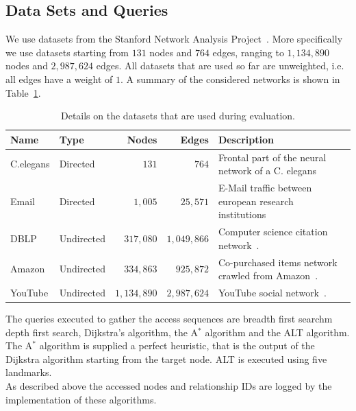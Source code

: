     \subsection*{Data Sets and Queries}
        We use datasets from the Stanford Network Analysis Project~\autocite{snap}.
        More specifically we use datasets starting from $131$ nodes and $764$ edges, ranging to $1,134,890$ nodes and $2,987,624$ edges.
        All datasets that are used so far are unweighted, i.e. all edges have a weight of $1$.
        A summary of the considered networks is shown in Table~\ref{datasets}.
        \begin{table}
        \begin{center}
            \begin{tabular}[c]{l l r r p{5.8cm}} \toprule
                Name & Type & Nodes & Edges & Description \\ \midrule
                 C.elegans & Directed & $131$ & $764$ & Frontal part of the neural network of a C. elegans~\autocite{celegans} \\ [0.8cm]
                 Email & Directed & $1,005$ & $25,571$ & E-Mail traffic between european research institutions~\autocite{email} \\ [0.8cm]
                 DBLP & Undirected & $317,080$ & $1,049,866$ & Computer science citation network~\autocite{lj}. \\ [0.8cm]
                 Amazon & Undirected & $334,863$ & $925,872$ & Co-purchased items network crawled from Amazon~\autocite{lj}. \\ [0.8cm]
                 YouTube & Undirected & $1,134,890$ & $2,987,624$ & YouTube social network~\autocite{mislove}. \\ \bottomrule
            \end{tabular}
            \end{center}
            \caption{Details on the datasets that are used during evaluation.}
            \label{datasets}
        \end{table}
        The queries executed to gather the access sequences are breadth first searchm depth first search, Dijkstra's algorithm, the A$^*$ algorithm and the ALT algorithm. 
        The A$^*$ algorithm is supplied a perfect heuristic, that is the output of the Dijkstra algorithm starting from the target node. ALT is executed using five landmarks. \\
        As described above the accessed nodes and relationship IDs are logged by the implementation of these algorithms.

